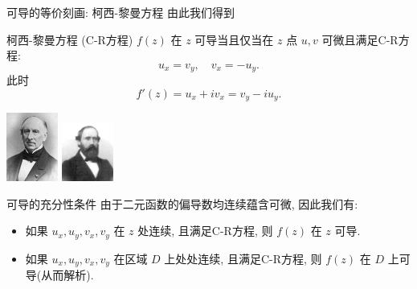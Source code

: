 \begin{frame}{可导的等价刻画: 柯西-黎曼方程}
\onslide<+->由此我们得到
\onslide<+->
\begin{alertblock}{柯西-黎曼方程 (C-R方程)}
$f(z)$ 在 $z$ 可导当且仅当在 $z$ 点 $u,v$ 可微且满足C-R方程:
\[u_x=v_y,\quad v_x=-u_y.\]
此时
\[f'(z)=u_x+iv_x=v_y-iu_y.\]
\end{alertblock}
\onslide<+->
\begin{center}
\includegraphics[width=1.7cm]{misc/Cauchy.jpeg}
\hspace{2cm}\includegraphics[width=1.7cm]{misc/Riemann.jpeg}
\end{center}
\end{frame}


\begin{frame}{可导的充分性条件}
\onslide<+->由于二元函数的偏导数均连续蕴含可微, 因此我们有:
\onslide<+->
\begin{theorem}
\begin{itemize}
	\item 如果 $u_x,u_y,v_x,v_y$ 在 $z$ 处连续, 且满足C-R方程, 则 $f(z)$ 在 $z$ 可导.
	\item 如果 $u_x,u_y,v_x,v_y$ 在区域 $D$ 上处处连续, 且满足C-R方程, 则 $f(z)$ 在 $D$ 上可导(从而解析).
\end{itemize}
\end{theorem}
\end{frame}






